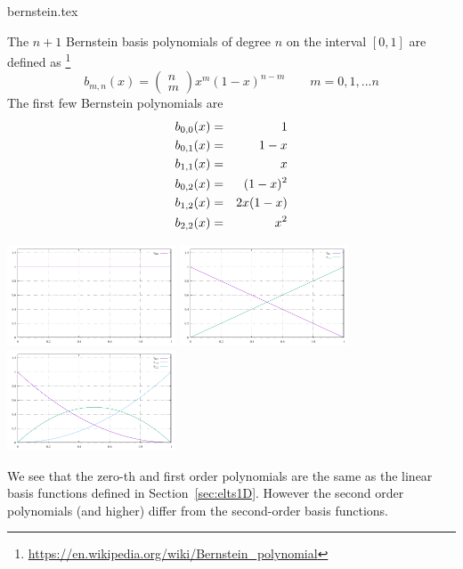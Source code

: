 \begin{flushright} {\tiny {\color{gray} bernstein.tex}} \end{flushright}


The $n+1$ Bernstein basis polynomials of degree $n$ on the interval $[0,1]$
are defined as \footnote{\url{https://en.wikipedia.org/wiki/Bernstein_polynomial}}
\[
b_{m,n}(x) = \left( \begin{array}{c} n \\ m \end{array}\right) x^m(1-x)^{n-m}
\qquad m=0,1,...n
\]
The first few Bernstein polynomials are 
\begin{eqnarray}
b_{0,0}(x) &=& 1 \\
b_{0,1}(x) &=& 1-x \nonumber\\
b_{1,1}(x) &=& x \\
b_{0,2}(x) &=& (1-x)^2 \nonumber\\
b_{1,2}(x) &=& 2x(1-x) \nonumber\\
b_{2,2}(x) &=& x^2 
\end{eqnarray}

\includegraphics[width=5cm]{images/bernstein/b0.pdf}
\includegraphics[width=5cm]{images/bernstein/b1.pdf}
\includegraphics[width=5cm]{images/bernstein/b2.pdf}

We see that the zero-th and first order polynomials are the same as the linear basis functions defined in 
Section~\ref{sec:elts1D}. However the second order polynomials (and higher) differ from the second-order
basis functions. 

